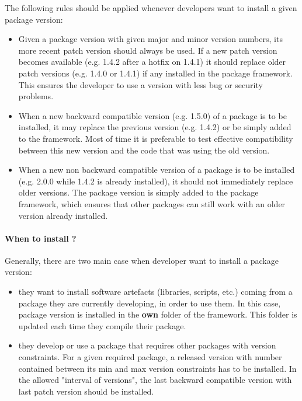 \documentclass[12pt,a4paper]{article}
\begin{document}
The following rules should be applied whenever developers want to install a given package version:
\begin{itemize}
\item Given a package version with given major and minor version numbers, its more recent patch version should always be used. If a new patch version becomes available (e.g. 1.4.2 after a hotfix on 1.4.1) it should replace older patch versions (e.g. 1.4.0 or 1.4.1) if any installed in the package framework. This ensures the developer to use a version with less bug or security problems.
\item When a new backward compatible version (e.g. 1.5.0) of a package is to be installed, it may replace the previous version (e.g. 1.4.2) or be simply added to the framework. Most of time it is preferable to test effective compatibility between this new version and the code that was using the old version.
\item When a new non backward compatible version of a package is to be installed (e.g. 2.0.0 while 1.4.2 is already installed), it should not immediately replace older versions. The package version is simply added to the package framework, which ensures that other packages can still work with an older version already installed.
\end{itemize}

\paragraph*{When to install ?}
Generally, there are two main case when developer want to install a package version:
\begin{itemize}
\item they want to install software artefacts (libraries, scripts, etc.) coming from a package they are currently developing, in order to use them. In this case, package version is installed in the \textbf{own} folder of the framework. This folder is updated each time they compile their package.
\item  they develop or use a package that requires other packages with version constraints. For a given required package, a released version with number contained between its min and max version constraints has to be installed. In the allowed "interval of versions", the last backward compatible version with last patch version should be installed.
\end{itemize}
\end{document}
